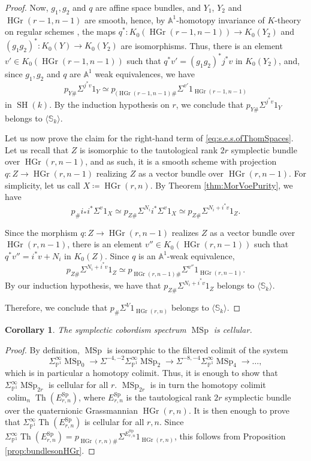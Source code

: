 \documentclass[10pt]{amsart}
\theoremstyle{definition}
\theoremstyle{plain}
\newtheorem{corollary}[defn]{Corollary}
\numberwithin{equation}{section}
\newcommand{\0}{\emptyset}
\newcommand{\A}{{\mathbb A}}
\renewcommand{\P}{{\mathbb P}}
\newcommand{\MSp}{{\operatorname{MSp}}}
\newcommand{\Sp}{{\operatorname{Sp}}}
\newcommand{\HGr}{{\operatorname{HGr}}}
\newcommand{\SH}{{\operatorname{SH}}}
\newcommand{\Th}{{\operatorname{Th}}}
\newcommand{\colim}{{\operatorname*{colim}}}
\begin{document}
\begin{proof}
Now, $g_1,g_2$ and $q$ are affine space bundles, and $Y_1$, $Y_2$ and 
$\HGr(r-1,n-1)$ are smooth, hence, by $\A^1$-homotopy invariance of $K$-theory on regular schemes \cite[\S7 paragraph 1, and Proposition 4.1]{Quillen:K}, the maps $q^*:K_0(\HGr(r-1,n-1))\to K_0(Y_2)$ and $(g_1g_2)^*:K_0(Y)\to K_0(Y_2)$ are isomorphisms. Thus, there is an element $v'\in K_0(\HGr(r-1,n-1))$ such that $q^*v'=(g_1g_2)^*j^*v$ in $K_0(Y_2)$, and, since $g_1,g_2$ and $q$ are $\A^1$ weak equivalences, we have
$$
p_{Y\#}\Sigma^{j^*v}1_Y \simeq p_{(\HGr(r-1,n-1)\#}\Sigma^{v'}1_{\HGr(r-1,n-1)}
$$
in $\SH(k)$. 
By the induction hypothesis on $r$, we conclude that $p_{Y\#} \Sigma^{j^*v}1_Y$ belongs to $\langle \mathbb{S}_k \rangle$.

Let us now prove the claim for the right-hand term of \eqref{eq:s.e.s.ofThomSpaces}. Let us recall that $Z$ is isomorphic to the tautological rank $2r$ symplectic bundle over $\HGr(r,n-1)$, and as such, it is a smooth scheme with projection $q:Z\to \HGr(r,n-1)$ realizing $Z$ as a vector bundle over $\HGr(r,n-1)$. For simplicity, let us call $X \coloneqq \HGr(r,n)$. By Theorem \ref{thm:MorVoePurity}, we have
$$p_{\#}i_*i^*\Sigma^v1_X \simeq p_{Z\#}\Sigma^{N_i}i^*\Sigma^v1_X \simeq p_{Z\#}\Sigma^{N_i+i^*v}1_Z.$$

Since the morphism $q:Z\to \HGr(r,n-1)$ realizes $Z$ as a vector bundle over $\HGr(r,n-1)$, there is an element $v''\in K_0(\HGr(r,n-1))$ such that $q^*v''=i^*v+N_i$ in $K_0(Z)$. Since $q$ is an $\A^1$-weak equivalence,
$$p_{Z\#}\Sigma^{N_i + i^*v}1_Z\simeq p_{\HGr(r,n-1)\#}\Sigma^{v''}1_{\HGr(r,n-1)}.$$
By our induction hypothesis, we have that $p_{Z\#}\Sigma^{N_i + i^*v}1_Z$ belongs to $\langle \mathbb{S}_k \rangle$.

Therefore, we conclude that $p_{\#}\Sigma^V1_{\HGr(r,n)}$ belongs to $\langle \mathbb{S}_k \rangle $.
\end{proof}

\begin{corollary}
\label{cor:cellularityofMSp}
    The symplectic cobordism spectrum $\MSp$ is cellular.
\end{corollary}

\begin{proof}
    By definition, $\MSp$ is isomorphic to the filtered colimit of the system
    $$\Sigma^\infty_{\P^1}\MSp_0 \to \Sigma^{-4,-2}\Sigma^\infty_{\P^1}\MSp_2 \to \Sigma^{-8,-4} \Sigma_{\P^1}^\infty \MSp_4 \to \ldots,$$
    which is in particular a homotopy colimit. Thus, it is enough to show that $\Sigma^\infty_{\P^1}\MSp_{2r}$ is cellular for all $r$. $\MSp_{2r}$ is in turn the homotopy colimit $\colim_n\Th(E_{r,n}^{\Sp})$, where $E_{r,n}^{\Sp}$ is the tautological rank $2r$ symplectic bundle over the quaternionic Grassmannian $\HGr(r,n)$. It is then enough to prove that $\Sigma^\infty_{\P^1}\Th(E_{r,n}^\Sp)$ is cellular for all $r,n$. Since $\Sigma^\infty_{\P^1}\Th(E_{r,n}^\Sp)=p_{\HGr(r,n)\#}\Sigma^{E_{r,n}^\Sp}1_{\HGr(r,n)}$, this follows from Proposition \ref{prop:bundlesonHGr}.
\end{proof}
\end{document}
